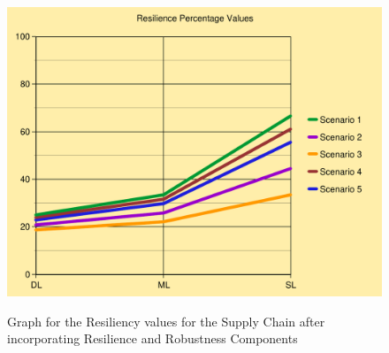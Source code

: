 \begin{figure}[H]
  \centering
  \includegraphics[width=5.5in]{figures/pdf/After(Graph).pdf}\\
  \caption{Graph for the Resiliency values for the Supply Chain after incorporating Resilience and Robustness Components}\label{G2}
\end{figure}  